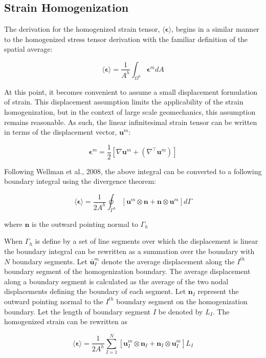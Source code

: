 \subsection{Strain Homogenization}

The derivation for the homogenized strain tensor, $\langle\boldsymbol{\epsilon}\rangle$, begins in a similar manner to the homogenized stress tensor derivation with the familiar definition of the spatial average:

\begin{equation}
\langle\boldsymbol{\epsilon}\rangle=\frac{1}{A^{h}}\int_{\Omega^{h}}\boldsymbol{\epsilon}^m dA\label{eqn:strain2}
\end{equation}

At this point, it becomes convenient to assume a small displacement formulation of strain. This displacement assumption limits the applicability of the strain homogenization, but in the context of large scale geomechanics, this assumption remains reasonable. As such, the linear infinitesimal strain tensor can be written in terms of the displacement vector, $\mathbf{u}^m$:

\begin{equation}
\boldsymbol{\epsilon}^m=\frac{1}{2}\left[\nabla\mathbf{u}^m+\left(\nabla^\top \mathbf{u}^m\right)\right]\label{eqn:strain1}
\end{equation}

Following Wellman et al., 2008, the above integral can be converted to a following boundary integral using the divergence theorem:

\begin{equation}
\langle\boldsymbol{\epsilon}\rangle=\frac{1}{2A^{h}}\oint_{\Gamma^{h}}\left[\mathbf{u}^m\otimes\mathbf{n}+\mathbf{n}\otimes\mathbf{u}^m\right]d\Gamma\label{eqn:strain5-1}
\end{equation}

where $\mathbf{n}$ is the outward pointing normal to $\Gamma_h$

When $\Gamma_h$ is define by a set of line segments over which the displacement is linear the boundary integral can be rewritten as a summation over the boundary with $N$ boundary segments. Let $\bar{\mathbf{u}}^m_{I}$ denote the average displacement along the $I^{th}$ boundary segment of the homogenization boundary. The average displacement along a boundary segment is calculated as the average of the two nodal displacements defining the boundary of each segment. Let $\mathbf{n}_{I}$ represent the outward pointing normal to the $I^{th}$ boundary segment on the homogenization boundary.  Let the length of boundary segment $I$ be denoted by $L_{I}$. The homogenized strain can be rewritten as

\begin{equation}
\langle\boldsymbol{\epsilon}\rangle=\frac{1}{2A^{h}}\sum_{I=1}^{N}\left[\mathbf{u}^m_{I}\otimes\mathbf{n}_{I}+\mathbf{n}_{I}\otimes\mathbf{u}^m_{I}\right]L_{I}\label{eqn:strain7}
\end{equation}
